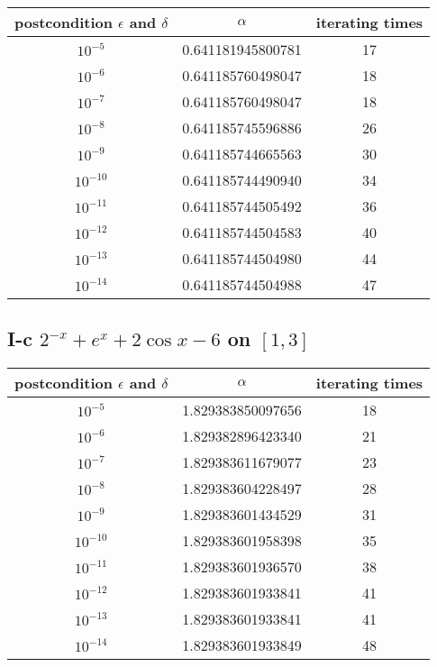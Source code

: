 \documentclass[twoside,a4paper]{article}
\begin{document}
\begin{tabular}{|c|c|c|}
\hline
postcondition  $\epsilon$ and $\delta$ & $\alpha$  & iterating times\\
\hline
$10^{-5}$ & 0.641181945800781 & 17\\
\hline
$10^{-6}$ & 0.641185760498047 & 18\\
\hline
$10^{-7}$ & 0.641185760498047 & 18\\
\hline
$10^{-8}$ & 0.641185745596886 & 26\\
\hline
$10^{-9}$ & 0.641185744665563 & 30\\
\hline
$10^{-10}$ & 0.641185744490940 & 34\\
\hline
$10^{-11}$ & 0.641185744505492 & 36\\
\hline
$10^{-12}$ & 0.641185744504583 & 40\\
\hline
$10^{-13}$ & 0.641185744504980 & 44\\
\hline
$10^{-14}$ & 0.641185744504988 & 47\\
\hline
\end{tabular}

\subsection*{I-c \small{$2^{-x}+e^{x}+2\cos x-6$ on $[1,3]$}}
\begin{tabular}{|c|c|c|}
\hline
postcondition  $\epsilon$ and $\delta$ & $\alpha$  & iterating times\\
\hline
$10^{-5}$ & 1.829383850097656 & 18\\
\hline
$10^{-6}$ & 1.829382896423340 & 21\\
\hline
$10^{-7}$ & 1.829383611679077 & 23\\
\hline
$10^{-8}$ & 1.829383604228497 & 28\\
\hline
$10^{-9}$ & 1.829383601434529 & 31\\
\hline
$10^{-10}$ & 1.829383601958398 & 35\\
\hline
$10^{-11}$ & 1.829383601936570 & 38\\
\hline
$10^{-12}$ & 1.829383601933841 & 41\\
\hline
$10^{-13}$ & 1.829383601933841 & 41\\
\hline
$10^{-14}$ & 1.829383601933849 & 48\\
\hline
\end{tabular}
\end{document}
